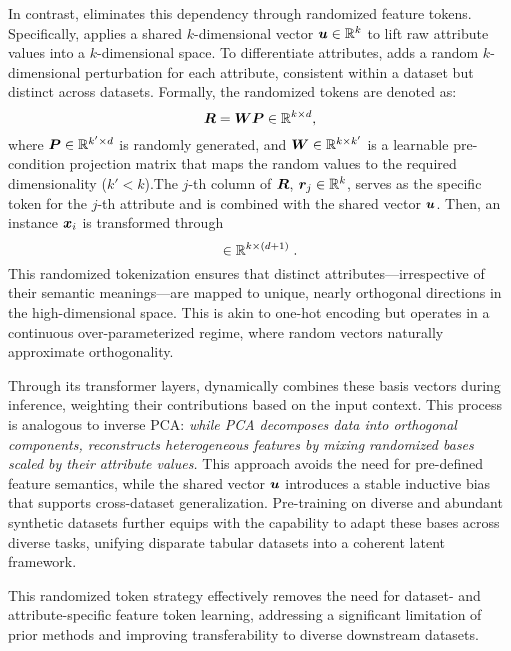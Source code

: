 In contrast, \ours eliminates this dependency through randomized feature tokens. Specifically, \ours applies a shared $k$-dimensional vector ${\bm{u}}\in\mathbb{R}^k$ to lift raw attribute values into a $k$-dimensional space. To differentiate attributes, \ours adds a random $k$-dimensional perturbation for each attribute, consistent within a dataset but distinct across datasets. Formally, the randomized tokens are denoted as:
\begin{equation} {\bm{R}} = {\bm{W}} {\bm{P}} \in {\mathbb{R}}^{k \times d},
\end{equation}
where ${\bm{P}} \in {\mathbb{R}}^{k' \times d}$ is randomly generated, and ${\bm{W}} \in {\mathbb{R}}^{k \times k'}$ is a learnable pre-condition projection matrix that maps the random values to the required dimensionality ($k'<k$).The $j$-th column of ${\bm{R}}$, ${\bm{r}}_j \in {\mathbb{R}}^k$, serves as the specific token for the $j$-th attribute and is combined with the shared vector ${\bm{u}}$. Then, an instance ${\bm{x}}_i$ is transformed through
\begin{equation} [{x_i^1} \cdot (\vu + \vr_1), \ldots, {x_i^d} \cdot (\vu + \vr_d), \tilde{\vy}_i] \in \sR^{k \times (d+1)} \;.\label{eq:tokenizer} \end{equation}
This randomized tokenization ensures that distinct attributes—irrespective of their semantic meanings—are mapped to unique, nearly orthogonal directions in the high-dimensional space. This is akin to one-hot encoding but operates in a continuous over-parameterized regime, where random vectors naturally approximate orthogonality.

Through its transformer layers, \ours dynamically combines these basis vectors during inference, weighting their contributions based on the input context. This process is analogous to inverse PCA: \emph{while PCA decomposes data into orthogonal components, \ours reconstructs heterogeneous features by mixing randomized bases scaled by their attribute values.} This approach avoids the need for pre-defined feature semantics, while the shared vector ${\bm{u}}$ introduces a stable inductive bias that supports cross-dataset generalization. Pre-training on diverse and abundant synthetic datasets further equips \ours with the capability to adapt these bases across diverse tasks, unifying disparate tabular datasets into a coherent latent framework.

This randomized token strategy effectively removes the need for dataset- and attribute-specific feature token learning, addressing a significant limitation of prior methods and improving transferability to diverse downstream datasets.

